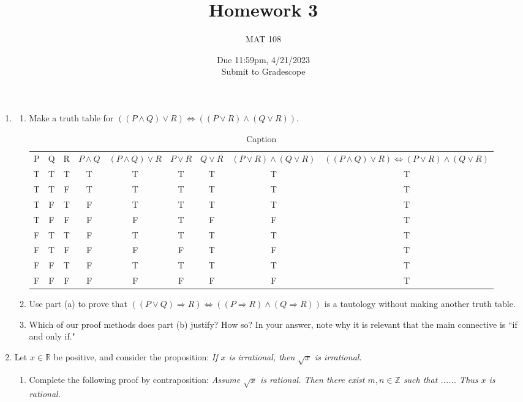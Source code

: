 \documentclass{article}
\title{Homework 3}
\author{MAT 108}
\date{Due 11:59pm, 4/21/2023\\
\vspace{0.1cm}
Submit to Gradescope}
\newcommand{\bR}{\mathbb{R}}
\newcommand{\bZ}{\mathbb{Z}}
\begin{document}
\maketitle
{\large
\begin{enumerate}[labelindent=0pt,leftmargin=0pt]
\setlength{\itemsep}{13pt}
\item\begin{enumerate}
\item Make a truth table for $((P\land Q)\lor R)\Leftrightarrow
((P\lor R)\land (Q\lor R))$.

\begin{table}[hbt!]
    \centering
    \begin{tabular}{c|c|c|c|c|c|c|c|c}
        P & Q & R & $P \land Q$ & $(P \land Q) \lor R$ & $P \lor R$ & $Q \lor R$ & $(P \lor R) \land (Q \lor R)$ & $((P \land Q) \lor R) \Leftrightarrow (P \lor R) \land (Q \lor R)$ \\
        T & T & T & T & T & T & T & T & T \\
        T & T & F & T & T & T & T & T & T \\
        T & F & T & F & T & T & T & T & T \\
        T & F & F & F & F & T & F & F & T \\
        F & T & T & F & T & T & T & T & T \\
        F & T & F & F & F & F & T & F & T \\
        F & F & T & F & T & T & T & T & T \\
        F & F & F & F & F & F & F & F & T \\
    \end{tabular}
    \caption{Caption}
    \label{tab:my_label}
\end{table}

\item Use part (a) to prove that $((P\lor Q)\Rightarrow
R)\Leftrightarrow ((P\Rightarrow R)\land(Q\Rightarrow R))$ is a tautology
without making another truth table.






\item Which of our proof methods does part (b) justify? How so? In
your answer, note why it is relevant that the main connective is ``if and
only if."
\end{enumerate}
\item Let $x\in\bR$ be positive, and consider the proposition:
\textit{If $x$ is irrational, then $\sqrt{x}$ is irrational.}
\begin{enumerate}
\item Complete the following proof by contraposition: \textit{Assume
$\sqrt{x}$ is rational. Then there exist $m,n\in\bZ$ such that ...... Thus
$x$ is rational.}


\end{enumerate}
\end{enumerate}}
\end{document}
